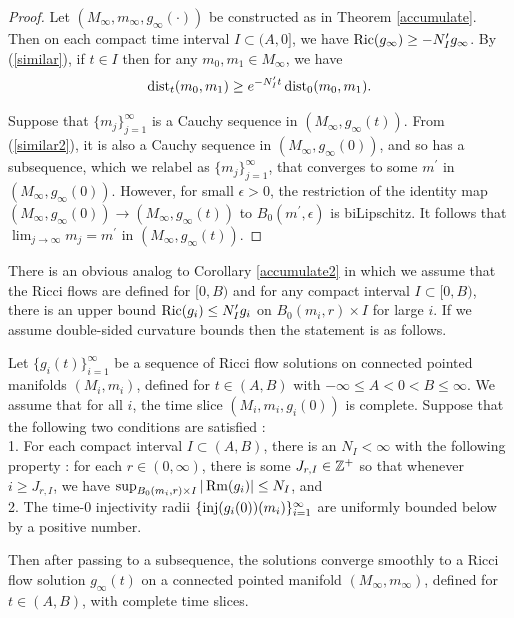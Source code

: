 \begin{proof}
Let $(M_\infty, m_\infty, g_\infty(\cdot))$ be constructed as in Theorem
\ref{accumulate}. Then on each compact time interval $I \subset (A, 0]$,
we have
$\operatorname{Ric}(g_\infty) \ge - N^\prime_I g_\infty$. By (\ref{similar}),
if $t \in I$ then for any $m_0, m_1 \in M_\infty$, we have
\begin{equation} \label{similar2}
\operatorname{dist}_t(m_0, m_1) \ge e^{- N^\prime_I t} \operatorname{dist}_0(m_0, m_1).
\end{equation}

Suppose that $\{m_j\}_{j=1}^\infty$ is a Cauchy sequence
in $(M_\infty, g_\infty(t))$. From (\ref{similar2}), it is also
a Cauchy sequence in $(M_\infty, g_\infty(0))$, and so has a
subsequence, which we relabel as $\{m_j\}_{j=1}^\infty$, that
converges to some $m^\prime$ in $(M_\infty, g_\infty(0))$.
However, for small $\epsilon > 0$, the restriction of the
identity map $(M_\infty, g_\infty(0)) \rightarrow
(M_\infty, g_\infty(t))$ to
$B_0(m^\prime, \epsilon)$ is biLipschitz.  It follows that
$\lim_{j \rightarrow \infty} m_j = m^\prime$ in
$(M_\infty, g_\infty(t))$.
\end{proof}

There is an obvious analog to Corollary \ref{accumulate2} in
which we assume that the Ricci flows are defined for $[0, B)$ and
for any compact interval $I \subset [0, B)$,
there is an upper bound $\operatorname{Ric}(g_i) \le N^\prime_I g_i$
on $B_0(m_i, r) \times I$ for large $i$.
If we assume double-sided curvature bounds
then the statement is as follows.

\begin{corollary}
  \label{cor:kl-convergent-subsequences-ricci-flow-solutions-existence-convergent-subsequences-ricci-flow-solutions-3}

\label{accumulate3}
Let $\{g_i(t)\}_{i=1}^\infty$ be a sequence of Ricci flow solutions
on connected pointed manifolds $(M_i, m_i)$,
defined for $t \in (A, B)$ with $-\infty \le A < 0 < B \le \infty$.
We assume that for all $i$, the time slice
$(M_i, m_i, g_i(0))$ is complete.
Suppose that the following
two conditions are satisfied : \\
1. For each compact interval $I \subset (A,B)$,
there is an $N_{I} < \infty$ with the following property :
for each $r \in (0, \infty)$, there is some $J_{r,I} \in {\mathbb Z}^+$
so that whenever $i \ge J_{r,I}$, we have
$\sup_{B_0(m_i, r) \times I} |\operatorname{Rm}(g_i)| \le N_{I}$, and \\
2. The
time-$0$ injectivity radii
$\{\operatorname{inj}(g_i(0))(m_i)\}_{i=1}^\infty$
are uniformly bounded below by a positive number.

Then after passing to a subsequence, the solutions converge smoothly
to a
Ricci flow solution $g_\infty(t)$ on a connected pointed manifold
$(M_\infty, m_\infty)$, defined for
$t \in (A, B)$, with complete time slices.
\end{corollary}

